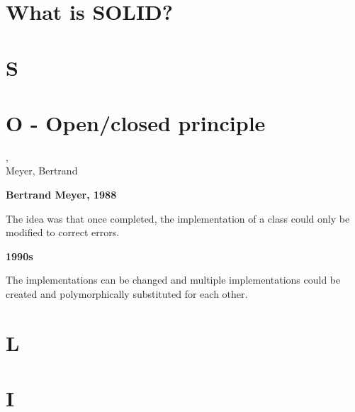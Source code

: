 \section{What is SOLID?} %
\label{sec:what_is_solid_}


\section{S} %
\label{sec:s}


\section{O - Open/closed principle} %
\label{sec:o}

\begin{frame}
	, \\Meyer, Bertrand 
\end{frame}

\begin{frame}
	

\begin{Parallel}[v]{5cm}{5cm}
    \ParallelLText%
    {
    	\textbf{Bertrand Meyer, 1988}
    			
    	The idea was that once completed, the implementation of a class could only be modified to correct errors.
    }
    \ParallelRText%
    {
    	\textbf{1990s}
    	
    	The implementations can be changed and multiple implementations could be created and polymorphically substituted for each other.
	}
\end{Parallel}

\end{frame}


\section{L} %
\label{sec:l}


\section{I} %
\label{sec:i}


